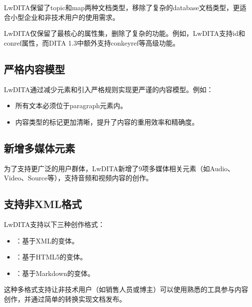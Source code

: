 \documentclass[letterpaper,10pt,english]{sphinxmanual}
\begin{document}
\sphinxAtStartPar
LwDITA保留了topic和map两种文档类型，移除了复杂的database文档类型，更适合小型企业和非技术用户的使用需求。

\sphinxAtStartPar
LwDITA仅保留了最核心的属性集，删除了复杂的功能。例如，LwDITA支持id和conref属性，而DITA 1.3中额外支持conkeyref等高级功能。

\sphinxAtStartPar
{}


\subsection{严格内容模型}
\label{\detokenize{dita/lightweight-dita:id4}}
\sphinxAtStartPar
LwDITA通过减少元素和引入严格规则实现更严谨的内容模型。例如：
\begin{itemize}
\item {} 
\sphinxAtStartPar
所有文本必须位于paragraph元素内。

\item {} 
\sphinxAtStartPar
内容类型的标记更加清晰，提升了内容的重用效率和精确度。

\end{itemize}


\subsection{新增多媒体元素}
\label{\detokenize{dita/lightweight-dita:id5}}
\sphinxAtStartPar
为了支持更广泛的用户群体，LwDITA新增了9项多媒体相关元素（如Audio、Video、Source等），支持音频和视频内容的创作。


\subsection{支持非XML格式}
\label{\detokenize{dita/lightweight-dita:xml}}
\sphinxAtStartPar
LwDITA支持以下三种创作格式：
\begin{itemize}
\item {} 
\sphinxAtStartPar
{}：基于XML的变体。

\item {} 
\sphinxAtStartPar
{}：基于HTML5的变体。

\item {} 
\sphinxAtStartPar
{}：基于Markdown的变体。

\end{itemize}

\sphinxAtStartPar
这种多格式支持让非技术用户（如销售人员或博主）可以使用熟悉的工具参与内容创作，并通过简单的转换实现文档发布。
\end{document}
